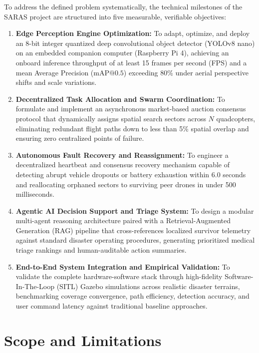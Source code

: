 To address the defined problem systematically, the technical milestones of the SARAS project are structured into five measurable, verifiable objectives:
\begin{enumerate}
    \item \textbf{Edge Perception Engine Optimization:} To adapt, optimize, and deploy an 8-bit integer quantized deep convolutional object detector (YOLOv8 nano) on an embedded companion computer (Raspberry Pi 4), achieving an onboard inference throughput of at least 15 frames per second (FPS) and a mean Average Precision ($\text{mAP@0.5}$) exceeding 80\% under aerial perspective shifts and scale variations.
    \item \textbf{Decentralized Task Allocation and Swarm Coordination:} To formulate and implement an asynchronous market-based auction consensus protocol that dynamically assigns spatial search sectors across $N$ quadcopters, eliminating redundant flight paths down to less than 5\% spatial overlap and ensuring zero centralized points of failure.
    \item \textbf{Autonomous Fault Recovery and Reassignment:} To engineer a decentralized heartbeat and consensus recovery mechanism capable of detecting abrupt vehicle dropouts or battery exhaustion within 6.0 seconds and reallocating orphaned sectors to surviving peer drones in under 500 milliseconds.
    \item \textbf{Agentic AI Decision Support and Triage System:} To design a modular multi-agent reasoning architecture paired with a Retrieval-Augmented Generation (RAG) pipeline that cross-references localized survivor telemetry against standard disaster operating procedures, generating prioritized medical triage rankings and human-auditable action summaries.
    \item \textbf{End-to-End System Integration and Empirical Validation:} To validate the complete hardware-software stack through high-fidelity Software-In-The-Loop (SITL) Gazebo simulations across realistic disaster terrains, benchmarking coverage convergence, path efficiency, detection accuracy, and user command latency against traditional baseline approaches.
\end{enumerate}

\section{Scope and Limitations}

